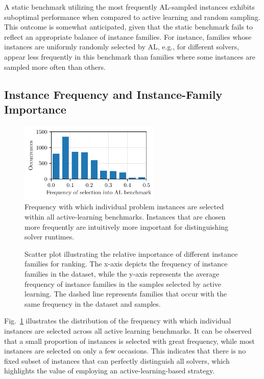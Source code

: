 \documentclass[sn-basic, Numbered]{sn-jnl} %
\begin{document}
A static benchmark utilizing the most frequently AL-sampled instances exhibits suboptimal performance when compared to active learning and random sampling.
This outcome is somewhat anticipated, given that the static benchmark fails to reflect an appropriate balance of instance families.
For instance, families whose instances are uniformly randomly selected by AL, e.g., for different solvers, appear less frequently in this benchmark than families where some instances are sampled more often than others.

\subsection{Instance Frequency and Instance-Family Importance}
\label{sec:eval:instance}

\begin{figure}[tbp]
  \centering
  \includegraphics[width=0.6\textwidth]{../plots/instoccs.pdf}
  \caption{Frequency with which individual problem instances are selected within all active-learning benchmarks. Instances that are chosen more frequently are intuitively more important for distinguishing solver runtimes.}
  \label{fig:instoccs}
\end{figure}

\begin{figure}[tb]
  \centering
  \caption{
    Scatter plot illustrating the relative importance of different instance families for ranking. The x-axis depicts the frequency of instance families in the dataset, while the y-axis represents the average frequency of instance families in the samples selected by active learning. The dashed line represents families that occur with the same frequency in the dataset and samples.
  }
  \label{fig:annifinalfamilies}
\end{figure}

Fig.~\ref{fig:instoccs} illustrates the distribution of the frequency with which individual instances are selected across all active learning benchmarks.
It can be observed that a small proportion of instances is selected with great frequency, while most instances are selected on only a few occasions.
This indicates that there is no fixed subset of instances that can perfectly distinguish all solvers, which highlights the value of employing an active-learning-based strategy.
\end{document}
